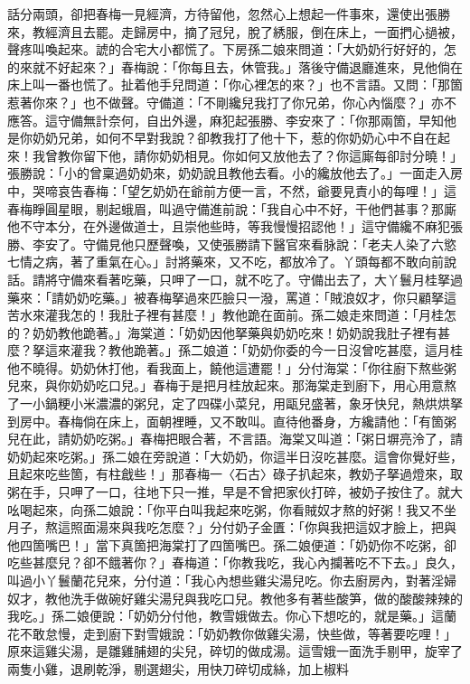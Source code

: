 話分兩頭，卻把春梅一見經濟，方待留他，忽然心上想起一件事來，還使出張勝來，教經濟且去罷。走歸房中，摘了冠兒，脫了綉服，倒在床上，一面捫心撾被，聲疼叫喚起來。諕的合宅大小都慌了。下房孫二娘來問道：「大奶奶行好好的，怎的來就不好起來？」春梅說：「你每且去，休管我。」落後守備退廳進來，見他倘在床上叫一番也慌了。扯着他手兒問道：「你心裡怎的來？」也不言語。又問：「那箇惹著你來？」也不做聲。守備道：「不剛纔兒我打了你兄弟，你心內惱麼？」亦不應答。這守備無計奈何，自出外邊，麻犯起張勝、李安來了：「你那兩箇，早知他是你奶奶兄弟，如何不早對我說？卻教我打了他十下，惹的你奶奶心中不自在起來！我曾教你留下他，請你奶奶相見。你如何又放他去了？你這廝每卻討分曉！」張勝說：「小的曾稟過奶奶來，奶奶說且教他去看。小的纔放他去了。」一面走入房中，哭啼哀告春梅：「望乞奶奶在爺前方便一言，不然，爺要見責小的每哩！」這春梅睜圓星眼，剔起蛾眉，叫過守備進前說：「我自心中不好，干他們甚事？那廝他不守本分，在外邊做道士，且崇他些時，等我慢慢招認他！」這守備纔不麻犯張勝、李安了。守備見他只歷聲喚，又使張勝請下醫官來看脉說：「老夫人染了六慾七情之病，著了重氣在心。」討將藥來，又不吃，都放冷了。丫頭每都不敢向前說話。請將守備來看著吃藥，只呷了一口，就不吃了。守備出去了，大丫鬟月桂拏過藥來：「請奶奶吃藥。」被春梅拏過來匹臉只一潑，罵道：「賊浪奴才，你只顧拏這苦水來灌我怎的！我肚子裡有甚麼！」教他跪在面前。孫二娘走來問道：「月桂怎的？奶奶教他跪著。」海棠道：「奶奶因他拏藥與奶奶吃來！奶奶說我肚子裡有甚麼？拏這來灌我？教他跪著。」孫二娘道：「奶奶你委的今一日沒曾吃甚麼，這月桂他不曉得。奶奶休打他，看我面上，饒他這遭罷！」分付海棠：「你往廚下熬些粥兒來，與你奶奶吃口兒。」春梅于是把月桂放起來。那海棠走到廚下，用心用意熬了一小鍋粳小米濃濃的粥兒，定了四碟小菜兒，用甌兒盛著，象牙快兒，熱烘烘拏到房中。春梅倘在床上，面朝裡睡，又不敢叫。直待他番身，方纔請他：「有箇粥兒在此，請奶奶吃粥。」春梅把眼合著，不言語。海棠又叫道：「粥日塀亮泠了，請奶奶起來吃粥。」孫二娘在旁說道：「大奶奶，你這半日沒吃甚麼。這會你覺好些，且起來吃些箇，有柱戧些！」那春梅一〈石古〉碌子扒起來，教奶子拏過燈來，取粥在手，只呷了一口，往地下只一推，早是不曾把家伙打碎，被奶子按住了。就大吆喝起來，向孫二娘說：「你平白叫我起來吃粥，你看賊奴才熬的好粥！我又不坐月子，熬這照面湯來與我吃怎麼？」分付奶子金匱：「你與我把這奴才臉上，把與他四箇嘴巴！」當下真箇把海棠打了四箇嘴巴。孫二娘便道：「奶奶你不吃粥，卻吃些甚麼兒？卻不餓著你？」春梅道：「你教我吃，我心內攔著吃不下去。」良久，叫過小丫鬟蘭花兒來，分付道：「我心內想些雞尖湯兒吃。你去廚房內，對著淫婦奴才，教他洗手做碗好雞尖湯兒與我吃口兒。教他多有著些酸笋，做的酸酸辣辣的我吃。」孫二娘便說：「奶奶分付他，教雪娥做去。你心下想吃的，就是藥。」這蘭花不敢怠慢，走到廚下對雪娥說：「奶奶教你做雞尖湯，快些做，等著要吃哩！」原來這雞尖湯，是雛雞脯翅的尖兒，碎切的做成湯。這雪娥一面洗手剔甲，旋宰了兩隻小雞，退刷乾淨，剔選翅尖，用快刀碎切成絲，加上椒料 
